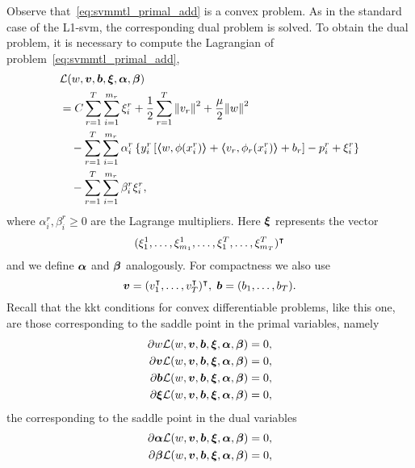 Observe that~\eqref{eq:svmmtl_primal_add} is a convex problem. As in the standard case of the L1-\acrshort{svm}, the corresponding dual problem is solved. To obtain the dual problem, it is necessary to compute the Lagrangian of problem~\eqref{eq:svmmtl_primal_add},
\begin{equation}\label{eq:svmmtl_lagrangian_add}
    \begin{aligned}
        & \lagr({w}, \fv{v}, \fv{b}, \fv{\xi}, \fv{\alpha}, \fv{\beta}) \\
        &= C \sum_{r= 1}^T \sum_{i=1}^{m_r} {\xi_{i}^r} + \frac{1}{2} \sum_{r= 1}^T{\norm{{v}_r}^2} + \frac{\mu}{2} {\norm{{w}}}^2 \\
        &\quad -  \sum_{r= 1}^T \sum_{i=1}^{m_r} \alpha_i^r \left\lbrace y_{i}^r \left[ \dotp{w}{\phi(x_{i}^r)} + \dotp{{v}_r}{\phi_r(x_{i}^r)} + b_r \right] - p_{i}^r + \xi_{i}^r  \right\rbrace \\
        &\quad -  \sum_{r= 1}^T \sum_{i=1}^{m_r} \beta_i^r \xi_i^r ,
    \end{aligned}
\end{equation}
where $\alpha_i^r, \beta_i^r \geq 0$ are the Lagrange multipliers. Here $\bm{\xi}$ represents the vector $$(\xi_1^1, \ldots, \xi_{m_1}^1, \ldots, \xi_1^T, \ldots, \xi_{m_T}^T)^\intercal$$ and we define $\bm{\alpha}$ and $\bm{\beta}$ analogously. For compactness we also use
$$ \bm{v} = (v_1^\intercal, \ldots, v_T^\intercal)^\intercal,\; \bm{b} = (b_1, \ldots, b_T).$$
Recall that the \acrshort{kkt} conditions for convex differentiable problems, like this one, are those corresponding to the saddle point in the primal variables, namely
\begin{align}
    \partial w \mathcal{L}({w}, \bm{v}, \bm{b}, \bm{\xi}, \bm{\alpha}, \bm{\beta}) = 0, \nonumber \\
    \partial \bm{v} \mathcal{L}({w}, \bm{v}, \bm{b}, \bm{\xi}, \bm{\alpha}, \bm{\beta}) = 0, \nonumber \\
    \partial \bm{b} \mathcal{L}({w}, \bm{v}, \bm{b}, \bm{\xi}, \bm{\alpha}, \bm{\beta}) = 0, \nonumber \\
    \partial \bm{\xi} \mathcal{L}({w}, \bm{v}, \bm{b}, \bm{\xi}, \bm{\alpha}, \bm{\beta}) = 0 , \nonumber
\end{align}
the corresponding to the saddle point in the dual variables
\begin{align}
    \partial \bm{\alpha} \mathcal{L}({w}, \bm{v}, \bm{b}, \bm{\xi}, \bm{\alpha}, \bm{\beta}) = 0, \nonumber \\
    \partial \bm{\beta} \mathcal{L}({w}, \bm{v}, \bm{b}, \bm{\xi}, \bm{\alpha}, \bm{\beta}) = 0 , \nonumber
\end{align}
